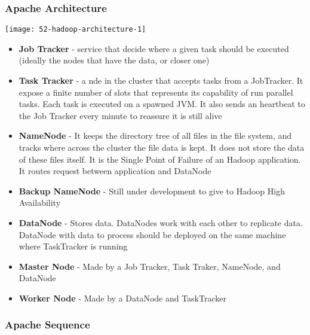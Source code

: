 \subsubsection{Apache Architecture}

\begin{center}
\texttt{[image: 52-hadoop-architecture-1]}
\end{center}

\begin{itemize}
	\item \textbf{Job Tracker}
	- service that decide where a given task should be executed (ideally the nodes that have the data, or closer one)
	\item \textbf{Task Tracker}
	- a nde in the cluster that accepts tasks from a JobTracker. It expose a finite number of slots that represents its capability of run parallel tasks. Each task is executed on a spawned JVM. It also sends an heartbeat to the Job Tracker every minute to reassure it is still alive
\end{itemize}

\begin{itemize}
	\item \textbf{NameNode}
	- It keeps the directory tree of all files in the file system, and tracks where across the cluster the file data is kept. It does not store the data of these files itself. It is the Single Point of Failure of an Hadoop application. It routes request between application and DataNode
	\item \textbf{Backup NameNode}
	- Still under development to give to Hadoop High Availability
	\item \textbf{DataNode}
	- Stores data. DataNodes work with each other to replicate data. DataNode with data to process should be deployed on the same machine where TaskTracker is running
\end{itemize}

\begin{itemize}
	\item \textbf{Master Node}
	- Made by a Job Tracker, Task Traker, NameNode, and DataNode
	\item \textbf{Worker Node}
	- Made by a DataNode and TaskTracker
\end{itemize}


\subsubsection{Apache Sequence}

